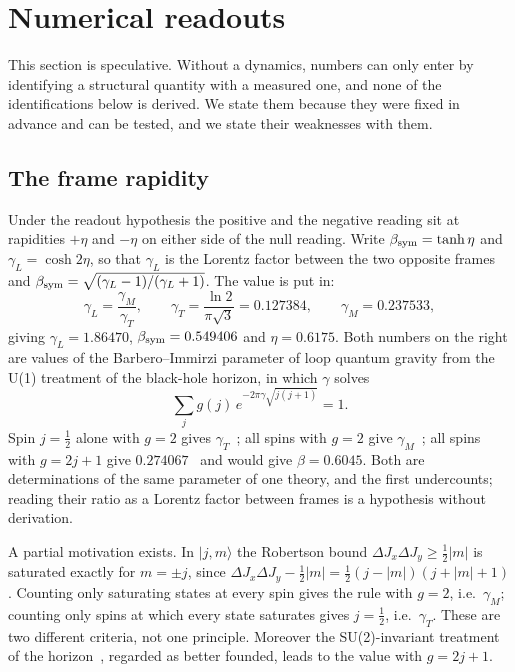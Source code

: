 \section{Numerical readouts}\label{sec:pheno}

This section is speculative.  Without a dynamics, numbers can only enter by identifying a structural quantity with a measured one, and
none of the identifications below is derived.  We state them because they were fixed in advance and can be tested, and we state their
weaknesses with them.

\subsection{The frame rapidity}

Under the readout hypothesis the positive and the negative reading sit at rapidities \(+\eta\) and \(-\eta\) on either side of the null reading.
Write \(\beta_{\rm sym}=\tanh\eta\) and \(\gamma_L=\cosh2\eta\), so that \(\gamma_L\) is the Lorentz factor between the two opposite frames and
\(\beta_{\rm sym}=\sqrt{(\gamma_L-1)/(\gamma_L+1)}\).  The value is put in:
\begin{equation}\label{eq:gammaL}
\gamma_L=\frac{\gamma_M}{\gamma_T},\qquad \gamma_T=\frac{\ln2}{\pi\sqrt3}=0.127384,\qquad \gamma_M=0.237533,
\end{equation}
giving \(\gamma_L=1.86470\), \(\beta_{\rm sym}=0.549406\) and \(\eta=0.6175\).  Both numbers on the right are values of the Barbero--Immirzi parameter of
loop quantum gravity from the U(1) treatment of the black-hole horizon, in which \(\gamma\) solves
\begin{equation}\label{eq:counting}
\sum_j g(j)\,e^{-2\pi\gamma\sqrt{j(j+1)}}=1 .
\end{equation}
Spin \(j=\tfrac12\) alone with \(g=2\) gives \(\gamma_T\)~\cite{abck}; all spins with \(g=2\) give \(\gamma_M\)~\cite{domagala,meissner}; all spins with
\(g=2j+1\) give \(0.274067\)~\cite{ghosh} and would give \(\beta=0.6045\).  Both are determinations of the same parameter of one theory, and the first
undercounts; reading their ratio as a Lorentz factor between frames is a hypothesis without derivation.

A partial motivation exists.  In \(|j,m\rangle\) the Robertson bound \(\Delta J_x\Delta J_y\ge\tfrac12|m|\) is saturated exactly for \(m=\pm j\), since
\(\Delta J_x\Delta J_y-\tfrac12|m|=\tfrac12(j-|m|)(j+|m|+1)\).  Counting only saturating states at every spin gives the rule with \(g=2\), i.e.\
\(\gamma_M\); counting only spins at which every state saturates gives \(j=\tfrac12\), i.e.\ \(\gamma_T\).  These are two different criteria, not one
principle.  Moreover the SU(2)-invariant treatment of the horizon~\cite{enp}, regarded as better founded, leads to the value with \(g=2j+1\).

